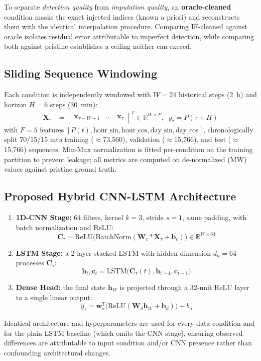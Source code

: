 \documentclass[conference]{IEEEtran}
\begin{document}
To separate \emph{detection quality} from \emph{imputation quality}, an \textbf{oracle-cleaned} condition masks the exact injected indices (known a priori) and reconstructs them with the identical interpolation procedure. Comparing IF-cleaned against oracle isolates residual error attributable to imperfect detection, while comparing both against pristine establishes a ceiling neither can exceed.

\subsection{Sliding Sequence Windowing}
Each condition is independently windowed with $W=24$ historical steps (2~h) and horizon $H=6$ steps (30~min):
\begin{align}
\mathbf{X}_\tau &= \begin{bmatrix} \mathbf{x}_{\tau-W+1} & \dots & \mathbf{x}_\tau \end{bmatrix}^T \in \mathbb{R}^{W \times F}, \;\;
y_\tau = P(\tau + H)
\end{align}
with $F=5$ features $[P(t), \text{hour\_sin}, \text{hour\_cos}, \text{day\_sin}, \text{day\_cos}]$, chronologically split 70/15/15 into training ($\approx$73{,}560), validation ($\approx$15{,}766), and test ($\approx$15{,}766) sequences. Min-Max normalization is fitted per-condition on the training partition to prevent leakage; all metrics are computed on de-normalized (MW) values against pristine ground truth.

\subsection{Proposed Hybrid CNN-LSTM Architecture}
\begin{enumerate}
    \item \textbf{1D-CNN Stage:} 64 filters, kernel $k=3$, stride $s=1$, same padding, with batch normalization and ReLU:
    \begin{equation}
    \mathbf{C}_\tau = \text{ReLU}\big(\text{BatchNorm}(\mathbf{W}_c * \mathbf{X}_\tau + \mathbf{b}_c)\big) \in \mathbb{R}^{W \times 64}
    \end{equation}
    \item \textbf{LSTM Stage:} a 2-layer stacked LSTM with hidden dimension $d_h=64$ processes $\mathbf{C}_\tau$:
    \begin{equation}
    \mathbf{h}_t, \mathbf{c}_t = \text{LSTM}\big(\mathbf{C}_\tau(t), \mathbf{h}_{t-1}, \mathbf{c}_{t-1}\big)
    \end{equation}
    \item \textbf{Dense Head:} the final state $\mathbf{h}_W$ is projected through a 32-unit ReLU layer to a single linear output:
    \begin{equation}
    \hat{y}_\tau = \mathbf{w}_o^T\big(\text{ReLU}(\mathbf{W}_d \mathbf{h}_W + \mathbf{b}_d)\big) + b_o
    \end{equation}
\end{enumerate}
Identical architecture and hyperparameters are used for every data condition and for the plain LSTM baseline (which omits the CNN stage), ensuring observed differences are attributable to input condition and/or CNN presence rather than confounding architectural changes.
\end{document}
